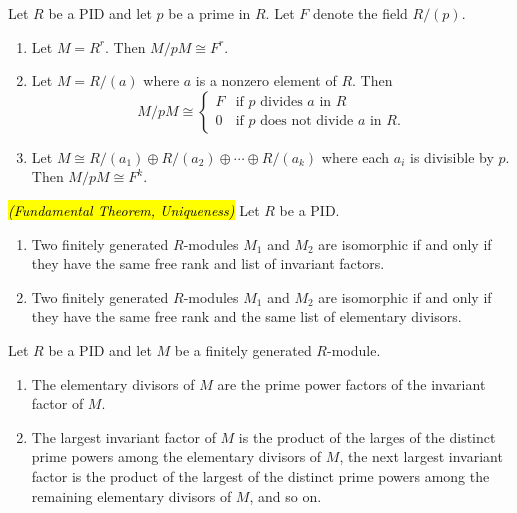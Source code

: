 \nl

\begin{lem}
Let $R$ be a PID and let $p$ be a prime in $R$. Let $F$ denote the field $R/(p)$.
\begin{enumerate}
\item Let $M = R^r$. Then $M/pM \cong F^r$.
\item Let $M = R/(a)$ where $a$ is a nonzero element of $R$. Then 
\[M/pM \cong \begin{cases}F & \text{if $p$ divides $a$ in $R$}\\ 0 &\text{if $p$ does not divide $a$ in $R$.}\end{cases}\]
\item Let $M\cong R/(a_1)\oplus R/(a_2)\oplus \cdots \oplus R/(a_k)$ where each $a_i$ is divisible by $p$. Then $M/pM \cong F^k$.
\end{enumerate}
\end{lem}

\nl

\begin{thm}\hl{\textit{(Fundamental Theorem, Uniqueness)}}
Let $R$ be a PID.
\begin{enumerate}
\item Two finitely generated $R$-modules $M_1$ and $M_2$ are isomorphic if and only if they have the same free rank and list of invariant factors.
\item Two finitely generated $R$-modules $M_1$ and $M_2$ are isomorphic if and only if they have the same free rank and the same list of elementary divisors.
\end{enumerate}
\end{thm}

\nl

\begin{cor}
Let $R$ be a PID and let $M$ be a finitely generated $R$-module.
\begin{enumerate}
\item The elementary divisors of $M$ are the prime power factors of the invariant factor of $M$.
\item The largest invariant factor of $M$ is the product of the larges of the distinct prime powers among the elementary divisors of $M$, the next largest invariant factor is the product of the largest of the distinct prime powers among the remaining elementary divisors of $M$, and so on.
\end{enumerate}
\end{cor}

\nl

